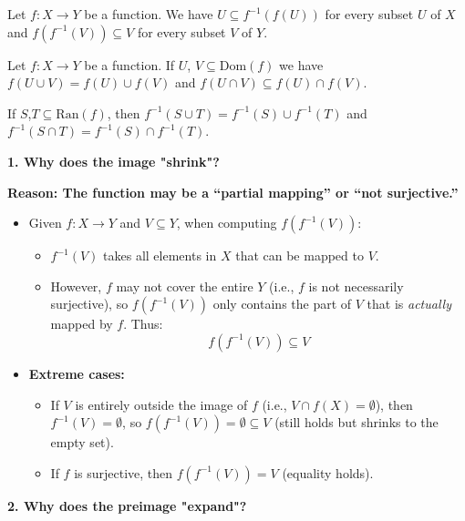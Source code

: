 \documentclass[../main.tex]{subfiles}
\begin{document}
\begin{yellow}
\begin{theorem}
Let $f:X\rightarrow Y$ be a function. We have $U\subseteq f^{-1}(f(U))$ for every subset $U$ of $X$ and $f(f^{-1}(V))\subseteq V $ for every subset $V$ of $Y$.

Let $f: X\rightarrow Y$ be a function. If $U$, $V\subseteq\text{Dom}(f)$ we have $f(U\cup V)=f(U)\cup f(V)$ and $f(U\cap V)\subseteq f(U)\cap f(V)$.

If $S$,$T\subseteq\text{Ran}(f)$, then $f^{-1}(S\cup T)=f^{-1}(S)\cup f^{-1}(T)$ and $f^{-1}(S\cap T)=f^{-1}(S)\cap f^{-1}(T)$.
\end{theorem}
\end{yellow}


\textbf{1. Why does the image "shrink"?}

\textbf{Reason: The function may be a ``partial mapping'' or ``not surjective.''}
\begin{itemize}
    \item Given $f: X \to Y$ and $V \subseteq Y$, when computing $f(f^{-1}(V))$:
    \begin{itemize}
        \item $f^{-1}(V)$ takes all elements in $X$ that can be mapped to $V$.
        \item However, $f$ may not cover the entire $Y$ (i.e., $f$ is not necessarily surjective), so $f(f^{-1}(V))$ only contains the part of $V$ that is \textit{actually} mapped by $f$. Thus:
        $$
            f(f^{-1}(V)) \subseteq V
        $$
    \end{itemize}
    \item \textbf{Extreme cases:}
    \begin{itemize}
        \item If $V$ is entirely outside the image of $f$ (i.e., $V \cap f(X) = \emptyset$), then $f^{-1}(V) = \emptyset$, so $f(f^{-1}(V)) = \emptyset \subseteq V$ (still holds but shrinks to the empty set).
        \item If $f$ is surjective, then $f(f^{-1}(V)) = V$ (equality holds).
    \end{itemize}
\end{itemize}

\textbf{2. Why does the preimage "expand"?}
\end{document}
